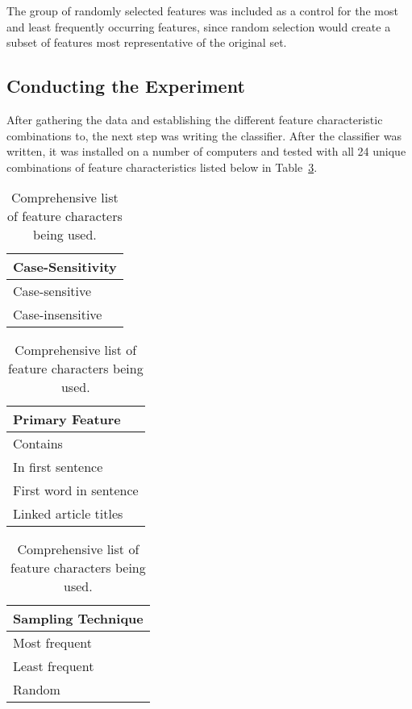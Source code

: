 The group of randomly selected features was included as a control for the most and least frequently occurring features, since random selection would create a subset of features most representative of the original set.

\subsection{Conducting the Experiment}

After gathering the data and establishing the different feature characteristic combinations to, the next step was writing the classifier.
After the classifier was written, it was installed on a number of computers and tested with all 24 unique combinations of feature characteristics listed below in Table~\ref{tab:feature-characteristics}. 

\begin{center}
\begin{table}[H]
\begin{minipage}[t]{.33\linewidth}
\vspace{0pt}
\centering
\begin{tabular}{l}
\textbf{Case-Sensitivity} \\
\hline
Case-sensitive \\
Case-insensitive \\
\end{tabular}
\end{minipage}\hfill
\begin{minipage}[t]{.33\linewidth}
\vspace{0pt}
\centering
\begin{tabular}{l}
\textbf{Primary Feature} \\
\hline
Contains \\
In first sentence \\
First word in sentence \\
Linked article titles \\
\end{tabular}
\end{minipage}\hfill
\begin{minipage}[t]{.33\linewidth}
\vspace{0pt}
\centering
\begin{tabular}{l}
\textbf{Sampling Technique} \\
\hline
Most frequent \\
Least frequent \\
Random \\
\end{tabular}
\end{minipage}
\caption{Comprehensive list of feature characters being used.\label{tab:feature-characteristics}}
\end{table}
\end{center}

